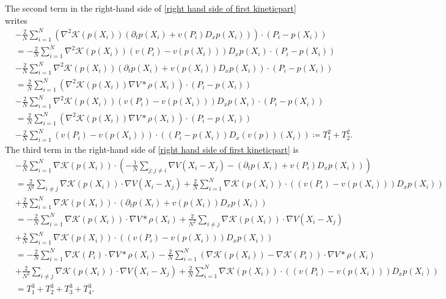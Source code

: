 \documentclass[11pt,reqno]{amsart}
\numberwithin{equation}{section}
\begin{document}
The second term in the right-hand side of \eqref{right hand side of first kineticpart} writes 
\begin{align*}
&-\frac{2}{N}\sum_{i=1}^{N}\left(\nabla^{2}\mathscr{K}(p(X_{i}))(\partial_{t}p(X_{i})+v(P_{i})D_{x}p(X_{i}))\right)\cdot (P_{i}-p(X_{i}))\\
&=-\frac{2}{N}\sum_{i=1}^{N}\nabla^{2}\mathscr{K}(p(X_{i}))(v(P_{i})-v(p(X_{i})))D_{x}p(X_{i})\cdot (P_{i}-p(X_{i}))\\
&-\frac{2}{N}\sum_{i=1}^{N}\nabla^{2}\mathscr{K}(p(X_{i}))(\partial_{t}p(X_{i})+v(p(X_{i}))D_{x}p(X_{i}))\cdot(P_{i}-p(X_{i}))\\
&=\frac{2}{N}\sum_{i=1}^{N}(\nabla^{2}\mathscr{K}(p(X_{i}))\nabla V\ast \rho(X_{i}))\cdot (P_{i}-p(X_{i}))\\
&-\frac{2}{N}\sum_{i=1}^{N}\nabla^{2} \mathscr{K}(p(X_{i}))(v(P_{i})-v(p(X_{i})))D_{x}p(X_{i})\cdot (P_{i}-p(X_{i}))\\
&=\frac{2}{N}\sum_{i=1}^{N}(\nabla^{2}\mathscr{K}(p(X_{i}))\nabla V\ast \rho(X_{i}))\cdot (P_{i}-p(X_{i}))\\
&-\frac{2}{N}\sum_{i=1}^{N}(v(P_{i})-v(p(X_{i})))\cdot \left((P_{i}-p(X_{i}))D_{x}(v(p))(X_{i})\right)\coloneqq T^{2}_{1}+T^{2}_{2}. 
\end{align*}
The third term in the right-hand side of \eqref{right hand side of first kineticpart} is 
\begin{align*}
&-\frac{2}{N}\sum_{i=1}^{N}\nabla \mathscr{K}(p(X_{i}))\cdot \left(-\frac{1}{N}\sum_{j:j\neq i}\nabla V(X_{i}-X_{j})-(\partial_{t}p(X_{i})+v(P_{i})D_{x}p(X_{i}))\right)\\
&=\frac{2}{N^{2}}\sum_{i\neq j}\nabla \mathscr{K}(p(X_{i}))\cdot \nabla V(X_{i}-X_{j})+\frac{2}{N}\sum_{i=1}^{N}\nabla \mathscr{K}(p(X_{i}))\cdot \left((v(P_{i})-v(p(X_{i})))D_{x}p(X_{i})\right)\\
&+\frac{2}{N}\sum_{i=1}^{N}\nabla \mathscr{K}(p(X_{i}))\cdot (\partial_{t}p(X_{i})+v(p(X_{i}))D_{x}p(X_{i}))\\
&=-\frac{2}{N}\sum_{i=1}^{N}\nabla \mathscr{K}(p(X_{i}))\cdot \nabla V\ast \rho(X_{i})+\frac{2}{N^{2}}\sum_{i\neq j}\nabla \mathscr{K}(p(X_{i}))\cdot \nabla V(X_{i}-X_{j})\\
&+\frac{2}{N}\sum_{i=1}^{N}\nabla \mathscr{K}(p(X_{i}))\cdot (\left(v(P_{i})-v(p(X_{i}))\right)D_{x}p(X_{i}))
\\
&=-\frac{2}{N}\sum_{i=1}^{N}\nabla \mathscr{K}(P_{i})\cdot \nabla V\ast \rho(X_{i})-\frac{2}{N}\sum_{i=1}^{N}(\nabla \mathscr{K}(p(X_{i}))-\nabla \mathscr{K}(P_{i}))\cdot \nabla V\ast \rho(X_{i})\\
&+\frac{2}{N^{2}}\sum_{i\neq j}\nabla \mathscr{K}(p(X_{i}))\cdot \nabla V(X_{i}-X_{j})+\frac{2}{N}\sum_{i=1}^{N}\nabla \mathscr{K}(p(X_{i}))\cdot \left((v(P_{i})-v(p(X_{i})))D_{x}p(X_{i})\right)
\\&= T^{3}_{1}+T^{3}_{2}+T^{3}_{3}+T^{3}_{4}. 
\end{align*}
\end{document}
